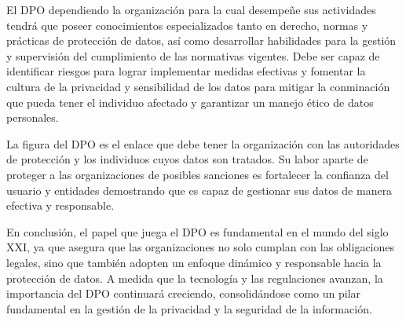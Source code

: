 \documentclass[stu, 11pt, letterpaper, donotrepeattitle, floatsintext, natbib]{apa7}
\begin{document}
El DPO dependiendo la organización para la cual desempeñe sus actividades tendrá que poseer conocimientos especializados tanto en derecho, normas y prácticas de protección de datos, así como desarrollar habilidades para la gestión y supervisión del cumplimiento de las normativas vigentes. Debe ser capaz de identificar riesgos para lograr implementar medidas efectivas y fomentar la cultura de la privacidad y sensibilidad de los datos para mitigar la conminación que pueda tener el individuo afectado y garantizar un manejo ético de datos personales.

La figura del DPO es el enlace que debe tener la organización con las autoridades de protección y los individuos cuyos datos son tratados. Su labor aparte de proteger a las organizaciones de posibles sanciones es fortalecer la confianza del usuario y entidades demostrando que es capaz de gestionar sus datos de manera efectiva y responsable.

En conclusión, el papel que juega el DPO es fundamental en el mundo del siglo XXI, ya que asegura que las organizaciones no solo cumplan con las obligaciones legales, sino que también adopten un enfoque dinámico y responsable hacia la protección de datos. A medida que la tecnología y las regulaciones avanzan, la importancia del DPO continuará creciendo, consolidándose como un pilar fundamental en la gestión de la privacidad y la seguridad de la información.


\newpage
\renewcommand\refname{\large\textbf{Referencias}}

\end{document}

